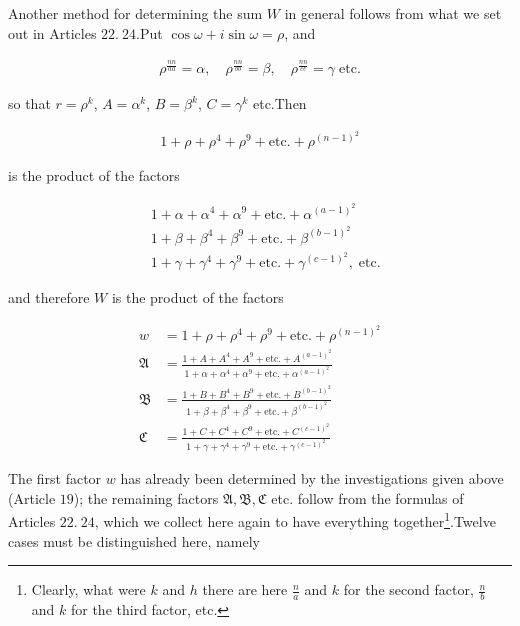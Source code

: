 
Another method for determining the sum $W$ in general follows from what we set out in Articles $22.\ 24$.\quad Put $\cos\omega+i\sin\omega=\rho$, and

\[
\begin{aligned}
\rho^{\frac{nn}{aa}}=\alpha,\quad\rho^{\frac{nn}{bb}}=\beta,\quad\rho^{\frac{nn}{cc}}=\gamma\;\text{etc.}
\end{aligned}
\]

so that $r=\rho^k$, $A=\alpha^k$, $B=\beta^k$, $C=\gamma^k$ etc.\quad Then

\[
\begin{aligned}
1+\rho+\rho^4+\rho^9+\text{etc.}+\rho^{(n-1)^2}
\end{aligned}
\]

is the product of the factors

\[
\begin{aligned}
&1+\alpha+\alpha^4+\alpha^9+\text{etc.}+\alpha^{(a-1)^2}\\
&1+\beta+\beta^4+\beta^9+\text{etc.}+\beta^{(b-1)^2}\\
&1+\gamma+\gamma^4+\gamma^9+\text{etc.}+\gamma^{(c-1)^2},\;\text{etc.}
\end{aligned}
\]


and therefore $W$ is the product of the factors

\[
\begin{aligned}
w&=1+\rho+\rho^4+\rho^9+\text{etc.}+\rho^{(n-1)^2}\\[2pt]
\mathfrak A&=\frac{1+A+A^4+A^9+\text{etc.}+A^{(a-1)^2}}{1+\alpha+\alpha^4+\alpha^9+\text{etc.}+\alpha^{(a-1)^2}}\\[2pt]
\mathfrak B&=\frac{1+B+B^4+B^9+\text{etc.}+B^{(b-1)^2}}{1+\beta+\beta^4+\beta^9+\text{etc.}+\beta^{(b-1)^2}}\\[2pt]
\mathfrak C&=\frac{1+C+C^4+C^9+\text{etc.}+C^{(c-1)^2}}{1+\gamma+\gamma^4+\gamma^9+\text{etc.}+\gamma^{(c-1)^2}}
\end{aligned}
\]

The first factor $w$ has already been determined by the investigations given above (Article $19$); the remaining factors $\mathfrak A,\mathfrak B,\mathfrak C$ etc. follow from the formulas of Articles $22.\ 24$, which we collect here again to have everything together\begingroup\renewcommand{\thefootnote}{*)}\footnote{Clearly, what were $k$ and $h$ there are here $\frac{n}{a}$ and $k$ for the second factor, $\frac{n}{b}$ and $k$ for the third factor, etc.}\endgroup.\quad Twelve cases must be distinguished here, namely


